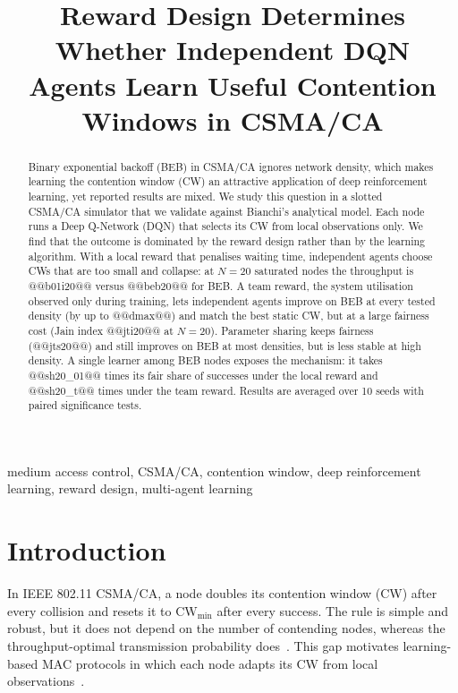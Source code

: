 \documentclass[conference]{IEEEtran}
\begin{document}
\title{Reward Design Determines Whether Independent DQN Agents Learn Useful Contention Windows in CSMA/CA}

\author{
}
\maketitle

\begin{abstract}
Binary exponential backoff (BEB) in CSMA/CA ignores network density, which makes learning the contention window (CW) an attractive application of deep reinforcement learning, yet reported results are mixed. We study this question in a slotted CSMA/CA simulator that we validate against Bianchi's analytical model. Each node runs a Deep Q-Network (DQN) that selects its CW from local observations only. We find that the outcome is dominated by the reward design rather than by the learning algorithm. With a local reward that penalises waiting time, independent agents choose CWs that are too small and collapse: at $N{=}20$ saturated nodes the throughput is @@b01i20@@ versus @@beb20@@ for BEB. A team reward, the system utilisation observed only during training, lets independent agents improve on BEB at every tested density (by up to @@dmax@@) and match the best static CW, but at a large fairness cost (Jain index @@jti20@@ at $N{=}20$). Parameter sharing keeps fairness (@@jts20@@) and still improves on BEB at most densities, but is less stable at high density. A single learner among BEB nodes exposes the mechanism: it takes @@sh20_01@@ times its fair share of successes under the local reward and @@sh20_t@@ times under the team reward. Results are averaged over 10 seeds with paired significance tests.
\end{abstract}

\begin{IEEEkeywords}
medium access control, CSMA/CA, contention window, deep reinforcement learning, reward design, multi-agent learning
\end{IEEEkeywords}

\section{Introduction}
In IEEE 802.11 CSMA/CA, a node doubles its contention window (CW) after every collision and resets it to $\mathrm{CW}_{\min}$ after every success. The rule is simple and robust, but it does not depend on the number of contending nodes, whereas the throughput-optimal transmission probability does~\cite{bianchi2000}. This gap motivates learning-based MAC protocols in which each node adapts its CW from local observations~\cite{amuru2015,wydmanski2021,yu2019}.
\end{document}
